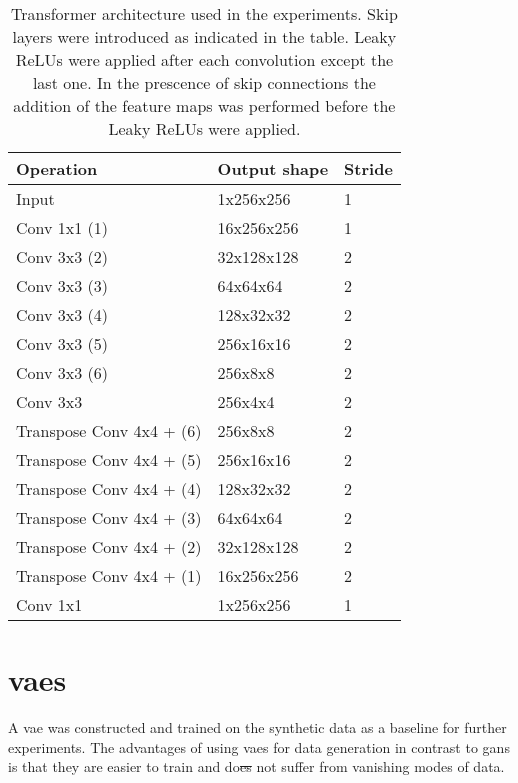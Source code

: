 \begin{table}[t]
    \centering
    \caption{Transformer architecture used in the experiments. Skip layers were introduced as indicated in the table. Leaky ReLUs were applied after each convolution except the last one. In the prescence of skip connections the addition of the feature maps was performed before the Leaky ReLUs were applied.}
    \label{tab:transformer}
    \begin{tabular}{|lll|}
        \hline
        Operation           & Output shape  & Stride \\ \hline
        Input               & 1x256x256     & 1     \\
        Conv 1x1 (1)           & 16x256x256    & 1     \\
        Conv 3x3 (2)            & 32x128x128    & 2     \\    
        Conv 3x3 (3)           & 64x64x64    & 2     \\ 
        Conv 3x3 (4)           & 128x32x32    & 2    \\ 
        Conv 3x3 (5)           & 256x16x16    & 2    \\ 
        Conv 3x3 (6)           & 256x8x8     & 2    \\ 
        Conv 3x3            & 256x4x4    & 2    \\ \hline
        Transpose Conv 4x4 + (6)  & 256x8x8    & 2    \\
        Transpose Conv 4x4 + (5) & 256x16x16    & 2    \\
        Transpose Conv 4x4 + (4) & 128x32x32    & 2    \\
        Transpose Conv 4x4 + (3) & 64x64x64    & 2    \\
        Transpose Conv 4x4 + (2) & 32x128x128    & 2    \\
        Transpose Conv 4x4 + (1)  & 16x256x256    & 2    \\
        Conv 1x1            & 1x256x256    & 1     \\ \hline
    \end{tabular}
\end{table}

\section{\acrlong{vaes}}
A \acrlong{vae} was constructed and trained on the synthetic data as a baseline for further experiments. The advantages of using \acrshort{vaes} for data generation in contrast to \acrshort{gans} is that they are easier to train and do\st{es} not suffer from vanishing modes of data.

